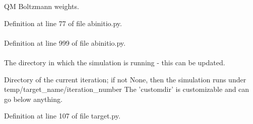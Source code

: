 \-Q\-M \-Boltzmann weights. 



\-Definition at line 77 of file abinitio.\-py.

\hypertarget{classforcebalance_1_1abinitio_1_1AbInitio_ac4f8e85daeccb2e46b724eddc76d38e1}{
\paragraph[{respterm}]{}}\label{classforcebalance_1_1abinitio_1_1AbInitio_ac4f8e85daeccb2e46b724eddc76d38e1}


\-Definition at line 999 of file abinitio.\-py.

\hypertarget{classforcebalance_1_1target_1_1Target_a1da470037ef61c22dc44beb85cfa01a9}{
\paragraph[{rundir}]{}}\label{classforcebalance_1_1target_1_1Target_a1da470037ef61c22dc44beb85cfa01a9}


\-The directory in which the simulation is running -\/ this can be updated. 

\-Directory of the current iteration; if not \-None, then the simulation runs under temp/target\-\_\-name/iteration\-\_\-number \-The 'customdir' is customizable and can go below anything.

\-Definition at line 107 of file target.\-py.

